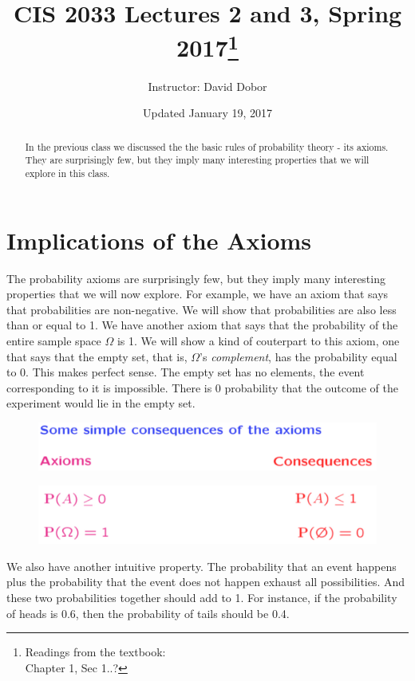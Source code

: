 \documentclass{tufte-handout}
\title{CIS 2033 Lectures 2 and 3, Spring 2017\thanks{Readings from the textbook: \\Chapter 1, Sec 1..?}}
\author[David Dobor]{Instructor: David Dobor}
\date{Updated January 19, 2017} %
\begin{document}
\maketitle%

\begin{abstract}
\noindent
In the previous class we discussed the the basic rules of probability theory - its axioms. They are surprisingly few, but they
imply many interesting properties that we will explore in this class. 
\end{abstract}


\section{Implications of the Axioms}\label{sec:intro}
The probability axioms are surprisingly few, but they
imply many interesting properties that we will now explore.
For example, we have an axiom that says that probabilities are non-negative. We will show that probabilities are
also less than or equal to 1. We have another axiom that says that the probability of the entire sample space $\Omega$
is 1. We will show a kind of couterpart to this axiom, one that says that the empty set, that is, $\Omega$'s \textit{complement}, has the probability equal to $0$. This makes
perfect sense. The empty set has no elements, the event corresponding to it is impossible. There is $0$ probability that the
outcome of the experiment would lie in the empty set. 
\begin{figure}
  \includegraphics{AxiomConseqHead}
\end{figure}

\begin{figure}
  \includegraphics{AxiomConseq1}
\end{figure}

We also have another intuitive property. The probability that an event happens plus the probability that
the event does not happen exhaust all possibilities. And these two probabilities together should add to
1. For instance, if the probability of heads is 0.6, then the probability of tails should be 0.4.
\end{document}

